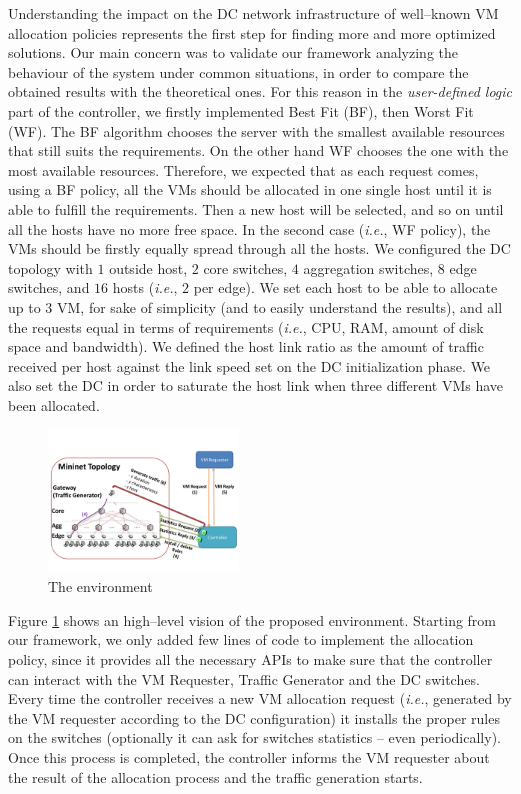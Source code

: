 \documentclass[12pt,english,oneside]{book}
\begin{document}
Understanding the impact on the DC network infrastructure of well--known VM allocation policies represents the first step for finding more and more optimized solutions. Our main concern was to validate our framework analyzing the behaviour of the system under common situations, in order to compare the obtained results with the theoretical ones. For this reason in the \textit{user-defined logic} part of the controller, we firstly implemented Best Fit (BF), then Worst Fit (WF). The BF algorithm chooses the server with the smallest available resources that still suits the requirements. On the other hand WF chooses the one with the most available resources. Therefore, we expected that as each request comes, using a BF policy, all the VMs should be allocated in one single host until it is able to fulfill the requirements. Then a new host will be selected, and so on until all the hosts have no more free space. In the second case (\textit{i.e.}, WF policy), the VMs should be firstly equally spread through all 
the hosts. We configured the DC topology with $1$ outside host, $2$ core switches, $4$ aggregation switches, $8$ edge switches, and $16$ hosts (\textit{i.e.}, $2$ per edge). We set each host to be able to allocate up to $3$ VM, for sake of simplicity (and to easily understand the results), and all the requests equal in terms of requirements (\textit{i.e.}, CPU, RAM, amount of disk space and bandwidth). We defined the host link ratio as the amount of traffic received per host against the link speed set on the DC initialization phase. We also set the DC in order to saturate the host link when three different VMs have been allocated.

\begin{figure}[h!tbp]
        \centering
        \includegraphics[width=0.45\textwidth]{figures/figure1.pdf}
        \caption{The environment}
        \label{fig:use_case}
\end{figure}


Figure \ref{fig:use_case} shows an high--level vision of the proposed environment. Starting from our framework, we only added few lines of code to implement the allocation policy, since it provides all the necessary APIs to make sure that the controller can interact with the VM Requester, Traffic Generator and the DC switches. Every time the controller receives a new VM allocation request (\textit{i.e.}, generated by the VM requester according to the DC configuration) it installs the proper rules on the switches (optionally it can ask for switches statistics -- even periodically). Once this process is completed, the controller informs the VM requester about the result of the allocation process and the traffic generation starts.
\end{document}
